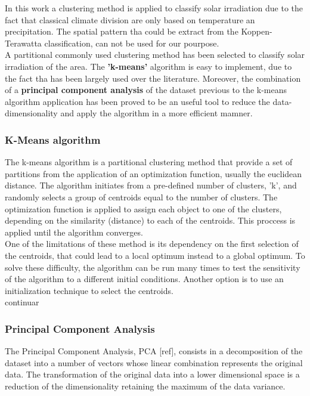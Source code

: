 In this work a clustering method is applied to classify solar irradiation due to the fact that classical climate division are only based on temperature an precipitation. The spatial pattern tha could be extract from the Koppen-Terawatta classification, can not be used for our pourpose.\\

A partitional commonly used clustering method has been selected to classify solar irradiation of the area. The \textbf{'k-means'} algorithm is easy to implement, due to the fact tha has been largely used over the literature. Moreover, the combination of a \textbf{principal component analysis} of the dataset previous to the k-means algorithm application has been proved to be an useful tool to reduce the data-dimensionality and apply the algorithm in a more efficient mamner.

\subsubsection{K-Means algorithm}

The k-means algorithm is a partitional clustering method that provide a set of partitions from the application of an optimization function, usually the euclidean distance. The algorithm initiates from a pre-defined number of clusters, 'k', and randomly selects a group of centroids equal to the number of clusters. The optimization function is applied to assign each object to one of the clusters, depending on the similarity (distance) to each of the centroids. This proccess is applied until the algorithm converges.\\

One of the limitations of these method is its dependency on the first selection of the centroids, that could lead to a local optimum instead to a global optimum. To solve these difficulty, the algorithm can be run many times to test the sensitivity of the algorithm to a different initial conditions. Another option is to use an initialization technique to select the centroids.\\

{\color{red}continuar}

\subsubsection{Principal Component Analysis}

The Principal Component Analysis, PCA [ref], consists in a decomposition of the dataset into a number of vectors whose linear combination represents the original data. The transformation of the original data into a lower dimensional space is a reduction of the dimensionality retaining the maximum of the data variance.\\

